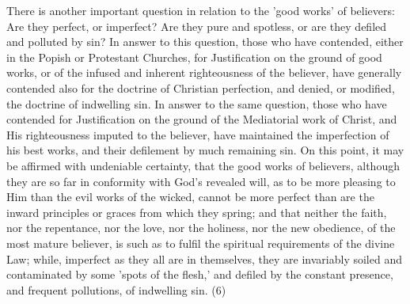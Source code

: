 \documentclass[
]{book}
\begin{document}
There is another important question in relation to the 'good works' of believers: Are they perfect, or imperfect? Are they pure and spotless, or are they defiled and polluted by sin? In answer to this question, those who have contended, either in the Popish or Protestant Churches, for Justification on the ground of good works, or of the infused and inherent righteousness of the believer, have generally contended also for the doctrine of Christian perfection, and denied, or modified, the doctrine of indwelling sin. In answer to the same question, those who have contended for Justification on the ground of the Mediatorial work of Christ, and His righteousness imputed to the believer, have maintained the imperfection of his best works, and their defilement by much remaining sin. On this point, it may be affirmed with undeniable certainty, that the good works of believers, although they are so far in conformity with God's revealed will, as to be more pleasing to Him than the evil works of the wicked, cannot be more perfect than are the inward principles or graces from which they spring; and that neither the faith, nor the repentance, nor the love, nor the holiness, nor the new obedience, of the most mature believer, is such as to fulfil the spiritual requirements of the divine Law; while, imperfect as they all are in themselves, they are invariably soiled and contaminated by some 'spots of the flesh,' and defiled by the constant presence, and frequent pollutions, of indwelling sin. (6)
\end{document}
